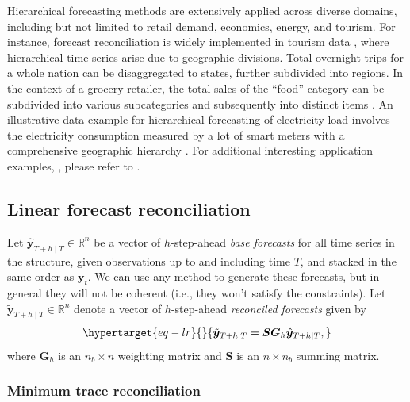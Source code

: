 \documentclass[
  11pt]{article}
\begin{document}
Hierarchical forecasting methods are extensively applied across diverse
domains, including but not limited to retail demand, economics, energy,
and tourism. For instance, forecast reconciliation is widely implemented
in tourism data \citep{Athanasopoulos2009-ps}, where hierarchical time
series arise due to geographic divisions. Total overnight trips for a
whole nation can be disaggregated to states, further subdivided into
regions. In the context of a grocery retailer, the total sales of the
``food'' category can be subdivided into various subcategories and
subsequently into distinct items \citep{Zhang2023-op}. An illustrative
data example for hierarchical forecasting of electricity load involves
the electricity consumption measured by a lot of smart meters with a
comprehensive geographic hierarchy \citep{Taieb2021-tc}. For additional
interesting application examples, , please refer to
\citet{Athanasopoulos2023-sm}.

\hypertarget{linear-forecast-reconciliation}{%
\subsection{Linear forecast
reconciliation}\label{linear-forecast-reconciliation}}

Let \(\hat{\bm{y}}_{T+h \mid T} \in \mathbb{R}^n\) be a vector of
\(h\)-step-ahead \emph{base forecasts} for all time series in the
structure, given observations up to and including time \(T\), and
stacked in the same order as \(\bm{y}_t\). We can use any method to
generate these forecasts, but in general they will not be coherent
(i.e., they won't satisfy the constraints). Let
\(\tilde{\bm{y}}_{T+h \mid T} \in \mathbb{R}^n\) denote a vector of
\(h\)-step-ahead \emph{reconciled forecasts} given by
\begin{equation}\protect\hypertarget{eq-lr}{}{
\tilde{\bm{y}}_{T+h \mid T} = \bm{S}\bm{G}_h\hat{\bm{y}}_{T+h \mid T},
}\label{eq-lr}\end{equation} where \(\bm{G}_h\) is an \(n_b \times n\)
weighting matrix and \(\bm{S}\) is an \(n \times n_b\) summing matrix.

\hypertarget{minimum-trace-reconciliation}{%
\subsubsection*{Minimum trace
reconciliation}\label{minimum-trace-reconciliation}}
\end{document}
